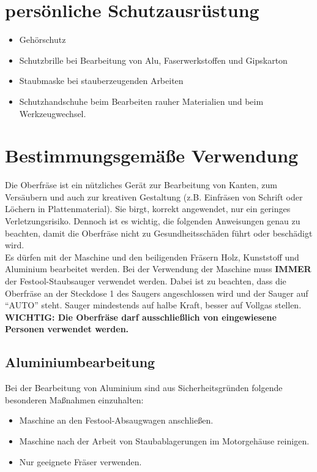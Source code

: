 \documentclass{\basedir/fablab-document}
\begin{document}
\section{persönliche Schutzausrüstung}

\begin{itemize}
\item Gehörschutz
\item Schutzbrille bei Bearbeitung von Alu, Faserwerkstoffen und Gipskarton
\item Staubmaske bei stauberzeugenden Arbeiten 
\item Schutzhandschuhe beim Bearbeiten rauher Materialien und beim Werkzeugwechsel.
\end{itemize}

\section{Bestimmungsgemäße Verwendung}
Die Oberfräse ist ein nützliches Gerät zur Bearbeitung von Kanten, zum Versäubern und auch zur kreativen Gestaltung (z.B. Einfräsen von Schrift oder Löchern in Plattenmaterial). Sie birgt, korrekt angewendet, nur ein geringes Verletzungsrisiko. Dennoch ist es wichtig, die folgenden Anweisungen genau zu beachten, damit die Oberfräse nicht zu Gesundheitsschäden führt oder beschädigt wird.\\
Es dürfen mit der Maschine und den beiligenden Fräsern Holz, Kunststoff und Aluminium bearbeitet werden. Bei der Verwendung der Maschine muss \textbf{IMMER} der Festool-Staubsauger verwendet werden. Dabei ist zu beachten, dass die Oberfräse an der Steckdose 1 des Saugers angeschlossen wird und der Sauger auf \enquote{AUTO} steht. Sauger mindestends auf halbe Kraft, besser auf Vollgas stellen.\\
\textbf{WICHTIG: Die Oberfräse darf ausschließlich von eingewiesene Personen verwendet werden.}


\subsection{Aluminiumbearbeitung}
Bei der Bearbeitung von Aluminium sind aus Sicherheitsgründen folgende besonderen Maßnahmen einzuhalten:
\begin{itemize}
\item Maschine an den Festool-Absaugwagen anschließen.
\item Maschine nach der Arbeit von Staubablagerungen im Motorgehäuse reinigen.
\item Nur geeignete Fräser verwenden.
\end{itemize}
\end{document}

